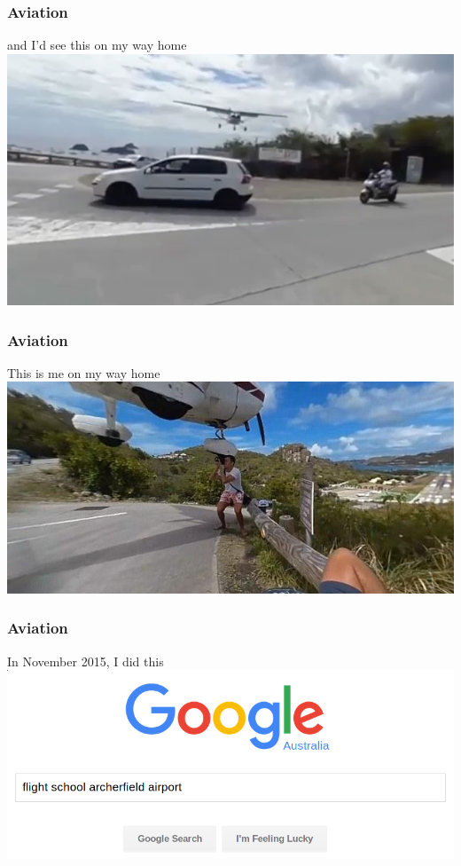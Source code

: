 \begin{frame}
\frametitle{Aviation}
\begin{block}{and I'd see this on my way home}
\includegraphics[height=0.5\textheight]{image/aeroplane-approach.jpg}
\end{block}
\end{frame}

\begin{frame}
\frametitle{Aviation}
\begin{block}{This is me on my way home}
\includegraphics[height=0.5\textheight]{image/aeroplane-graze-photographer.jpg}
\end{block}
\end{frame}

\begin{frame}
\frametitle{Aviation}
\begin{block}{In November 2015, I did this}
\includegraphics[height=0.5\textheight]{image/flight-school-google.png}
\end{block}
\end{frame}

